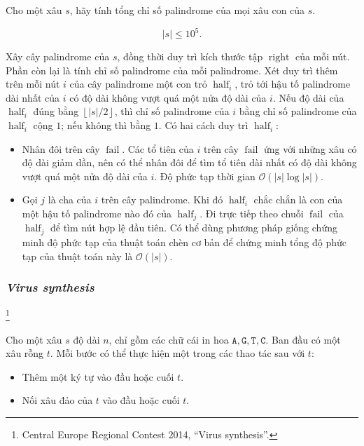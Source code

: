 \documentclass[11pt]{article}
\newcommand{\Oh}{\mathcal{O}}
\begin{document}
Cho một xâu \(s\), hãy tính tổng chỉ số palindrome của mọi xâu con của \(s\).

\[
|s|\le 10^5.
\]

Xây cây palindrome của \(s\), đồng thời duy trì kích thước tập
\(\operatorname{right}\) của mỗi nút. Phần còn lại là tính chỉ số palindrome
của mỗi palindrome. Xét duy trì thêm trên mỗi nút \(i\) của cây palindrome một
con trỏ \(\operatorname{half}_i\), trỏ tới hậu tố palindrome dài nhất của
\(i\) có độ dài không vượt quá một nửa độ dài của \(i\). Nếu độ dài của
\(\operatorname{half}_i\) đúng bằng \(\left\lfloor |s|/2\right\rfloor\), thì
chỉ số palindrome của \(i\) bằng chỉ số palindrome của \(\operatorname{half}_i\)
cộng \(1\); nếu không thì bằng \(1\). Có hai cách duy trì
\(\operatorname{half}_i\):

\begin{itemize}
  \item Nhân đôi trên cây \(\operatorname{fail}\). Các tổ tiên của \(i\) trên
  cây \(\operatorname{fail}\) ứng với những xâu có độ dài giảm dần, nên có thể
  nhân đôi để tìm tổ tiên dài nhất có độ dài không vượt quá một nửa độ dài
  của \(i\). Độ phức tạp thời gian \(\Oh(|s|\log |s|)\).
  \item Gọi \(j\) là cha của \(i\) trên cây palindrome. Khi đó
  \(\operatorname{half}_i\) chắc chắn là con của một hậu tố palindrome nào đó
  của \(\operatorname{half}_j\). Đi trực tiếp theo chuỗi
  \(\operatorname{fail}\) của \(\operatorname{half}_j\) để tìm nút hợp lệ đầu
  tiên. Có thể dùng phương pháp giống chứng minh độ phức tạp của thuật toán
  chèn cơ bản để chứng minh tổng độ phức tạp của thuật toán này là \(\Oh(|s|)\).
\end{itemize}

\subsubsection{\emph{Virus synthesis}}
\footnote{Central Europe Regional Contest 2014, ``Virus synthesis''.}

Cho một xâu \(s\) độ dài \(n\), chỉ gồm các chữ cái in hoa
\(\texttt{A},\texttt{G},\texttt{T},\texttt{C}\). Ban đầu có một xâu rỗng
\(t\). Mỗi bước có thể thực hiện một trong các thao tác sau với \(t\):

\begin{itemize}
  \item Thêm một ký tự vào đầu hoặc cuối \(t\).
  \item Nối xâu đảo của \(t\) vào đầu hoặc cuối \(t\).
\end{itemize}
\end{document}
